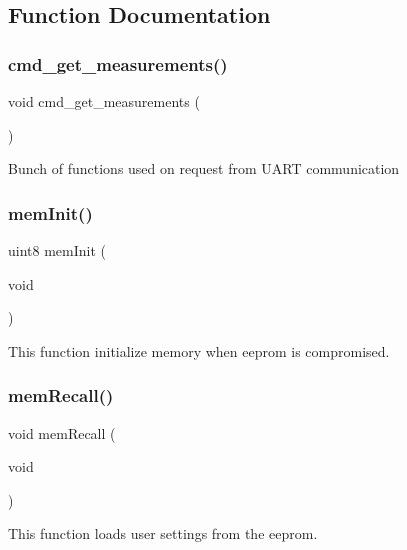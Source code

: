 \subsection{Function Documentation}
\mbox{\label{command__processing_8h_af5ccd403f1d3e49c97bafd6e7713cff3}} 
\subsubsection{cmd\+\_\+get\+\_\+measurements()}
{\footnotesize\ttfamily void cmd\+\_\+get\+\_\+measurements (\begin{DoxyParamCaption}{ }\end{DoxyParamCaption})}

Bunch of functions used on request from U\+A\+RT communication \mbox{\label{command__processing_8h_a48f1d2aa212e255d0a3322e576fc8574}} 
\subsubsection{mem\+Init()}
{\footnotesize\ttfamily uint8 mem\+Init (\begin{DoxyParamCaption}\item[{void}]{ }\end{DoxyParamCaption})}

This function initialize memory when eeprom is compromised. \mbox{\label{command__processing_8h_a494f1f72ae370f0057e5aa3db73ef6fb}} 
\subsubsection{mem\+Recall()}
{\footnotesize\ttfamily void mem\+Recall (\begin{DoxyParamCaption}\item[{void}]{ }\end{DoxyParamCaption})}

This function loads user settings from the eeprom. \mbox{\label{command__processing_8h_af67845c368ea7fefb79a1f0baa12134c}} 
